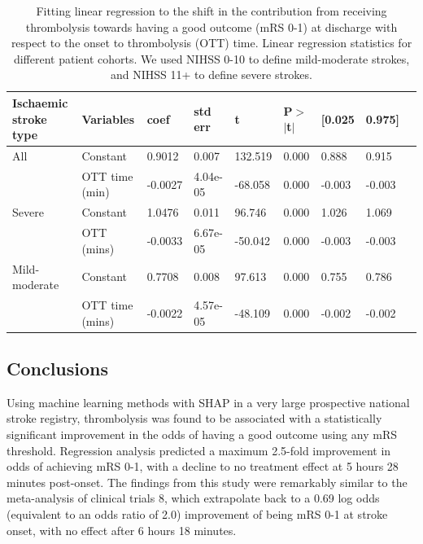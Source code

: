 \begin{table}
    \caption{Fitting linear regression to the shift in the contribution from receiving thrombolysis towards having a good outcome (mRS 0-1) at discharge with respect to the onset to thrombolysis (OTT) time. Linear regression statistics for different patient cohorts. We used NIHSS 0-10 to define mild-moderate strokes, and NIHSS 11+ to define severe strokes.}
    \centering
        \begin{tabular}{lllllllll}
        \toprule
         Ischaemic stroke type & Variables & coef & std err & t & P$>$$|$t$|$ & [0.025 & 0.975] \\ 
         \midrule
        All & Constant & 0.9012 & 0.007 & 132.519 & 0.000 & 0.888 & 0.915\\
        & OTT time (min) &  -0.0027  & 4.04e-05 & -68.058 & 0.000 & -0.003 & -0.003\\   
        \midrule
        Severe & Constant & 1.0476  &    0.011  & 96.746 & 0.000 & 1.026 & 1.069\\
        & OTT (mins) & -0.0033 &  6.67e-05  & -50.042 & 0.000 & -0.003 & -0.003\\ 
        \midrule
        Mild-moderate & Constant &           0.7708 &     0.008   & 97.613 & 0.000 & 0.755 & 0.786\\
        & OTT time (mins) &  -0.0022 &   4.57e-05 & -48.109 & 0.000 & -0.002 & -0.002\\
        \bottomrule
        \end{tabular}
      \label{fig:stats_table_mrs1}
\end{table}

\subsection{Conclusions}

Using machine learning methods with SHAP in a very large prospective national stroke registry, thrombolysis was found to be associated with a statistically significant improvement in the odds of having a good outcome using any mRS threshold. Regression analysis predicted a maximum 2.5-fold improvement in odds of achieving mRS 0-1, with a decline to no treatment effect at 5 hours 28 minutes post-onset. The findings from this study were remarkably similar to the meta-analysis of clinical trials 8, which extrapolate back to a 0.69 log odds (equivalent to an odds ratio of 2.0) improvement of being mRS 0-1 at stroke onset, with no effect after 6 hours 18 minutes.